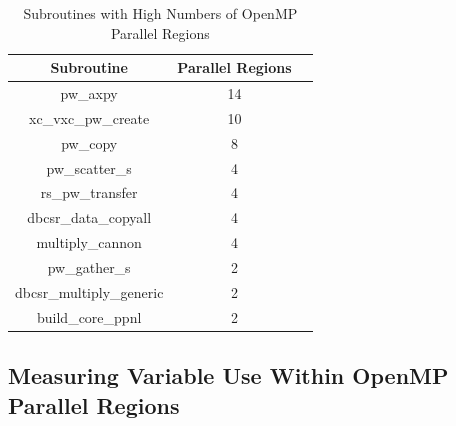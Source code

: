 \begin{table}[htbp]
\caption{Subroutines with High Numbers of OpenMP Parallel Regions}
\begin{center}
\begin{tabular}{|c|c|c|}
\hline
\textbf{Subroutine} & \textbf{Parallel Regions} \\
\hline
pw\_axpy & 14 \\
\hline
xc\_vxc\_pw\_create & 10 \\
\hline
pw\_copy & 8 \\
\hline
pw\_scatter\_s & 4 \\
\hline
rs\_pw\_transfer & 4 \\
\hline
dbcsr\_data\_copyall & 4 \\
\hline
multiply\_cannon & 4 \\
\hline
pw\_gather\_s & 2 \\
\hline
dbcsr\_multiply\_generic & 2 \\
\hline
build\_core\_ppnl & 2 \\
\hline
\end{tabular}
\label{tbl:parallel-regions}
\end{center}
\end{table}


\subsection{Measuring Variable Use Within OpenMP Parallel Regions}

